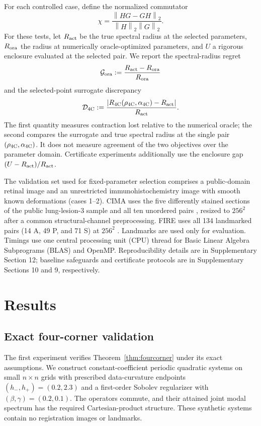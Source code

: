 \documentclass[11pt]{article}
\theoremstyle{definition}
\newcommand{\norm}[1]{\left\lVert #1\right\rVert}
\begin{document}
For each controlled case, define the normalized commutator
\[
\chi=\frac{\norm{HG-GH}_2}{\norm H_2\norm G_2}.
\]
For these tests, let $R_{\rm act}$ be the true spectral radius at the selected
parameters, $R_{\rm ora}$ the radius at numerically oracle-optimized
parameters, and $U$ a rigorous enclosure evaluated at the selected pair. We
report the spectral-radius regret
\[
\mathcal G_{\rm ora}
:=\frac{R_{\rm act}-R_{\rm ora}}{R_{\rm ora}}
\]
and the selected-point surrogate discrepancy
\[
\mathcal D_{\rm 4C}
:=\frac{|R_{\rm 4C}(\rho_{\rm 4C},\alpha_{\rm 4C})
-R_{\rm act}|}{R_{\rm act}}.
\]
The first quantity measures contraction lost relative to the numerical oracle;
the second compares the surrogate and true spectral radius at the single pair
$(\rho_{\rm 4C},\alpha_{\rm 4C})$. It does not measure agreement of the two
objectives over the parameter domain. Certificate experiments additionally
use the enclosure gap $(U-R_{\rm act})/R_{\rm act}$.

The validation set used for fixed-parameter selection comprises a
public-domain retinal image and an unrestricted immunohistochemistry image
with smooth known deformations (cases 1--2). CIMA uses
the five differently stained sections of the public lung-lesion-3 sample and
all ten unordered pairs \cite{Borovec2018}, resized to $256^2$ after a common
structural-channel preprocessing. FIRE uses all 134 landmarked pairs (14 A, 49
P, and 71 S) at $256^2$ \cite{HernandezMatas2017}. Landmarks are used only for
evaluation. Timings use one central processing unit (CPU) thread for Basic
Linear Algebra Subprograms (BLAS) and OpenMP. Reproducibility details are in
Supplementary Section 12; baseline safeguards and certificate protocols are in
Supplementary Sections 10 and 9, respectively.

\section{Results}\label{sec:results}
\subsection{Exact four-corner validation}
The first experiment verifies Theorem~\ref{thm:fourcorner} under its exact
assumptions. We construct constant-coefficient periodic quadratic systems on
small $n\times n$ grids with prescribed data-curvature endpoints
$(h_-,h_+)=(0.2,2.3)$ and a first-order Sobolev regularizer with
$(\beta,\gamma)=(0.2,0.1)$. The operators commute, and their attained joint
modal spectrum has the required Cartesian-product structure. These synthetic
systems contain no registration images or landmarks.
\end{document}
